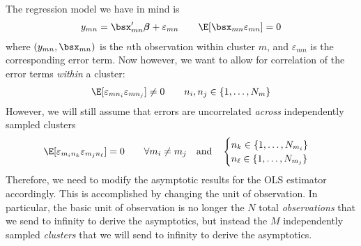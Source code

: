 \documentclass[12pt]{article}
\theoremstyle{plain}
\theoremstyle{definition}
\theoremstyle{remark}
\newcommand{\bsbeta}{\boldsymbol{\beta}}
\begin{document}
The regression model we have in mind is
\begin{align}
  y_{mn} = \bsx_{mn}'\bsbeta + \varepsilon_{mn}
  \qquad \E[\bsx_{mn}\varepsilon_{mn}] = 0
  \label{clusterModel}
\end{align}
where $(y_{mn},\bsx_{mn})$ is the $n$th observation within cluster $m$,
and $\varepsilon_{mn}$ is the corresponding error term.
Now however, we want to allow for correlation of the error terms
\emph{within} a cluster:
\begin{align*}
  \E[\varepsilon_{mn_i}\varepsilon_{mn_j}]\neq 0
  \qquad n_i,n_j \in \{1,\ldots,N_m\}
\end{align*}
However, we will still assume that errors are uncorrelated \emph{across}
independently sampled clusters
\begin{align*}
  \E[\varepsilon_{m_in_k}\varepsilon_{m_jn_\ell}]= 0
  \qquad \forall m_i \neq m_j
  \quad\text{and}
  \quad
  \begin{cases}
    n_k \in \{1,\ldots,N_{m_i}\} \\
    n_\ell \in \{1,\ldots,N_{m_j}\} \\
  \end{cases}
\end{align*}
Therefore, we need to modify the asymptotic results for the OLS
estimator accordingly. This is accomplished by changing the unit of
observation. In particular, the basic unit of observation is no longer
the $N$ total \emph{observations} that we send to infinity to derive the
asymptotics, but instead the $M$ independently sampled \emph{clusters}
that we will send to infinity to derive the asymptotics.
\end{document}
